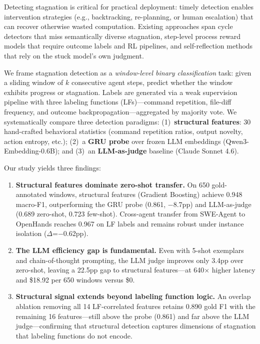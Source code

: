\documentclass[11pt,a4paper]{article}
\begin{document}
Detecting stagnation is critical for practical deployment: timely detection enables intervention strategies (e.g., backtracking, re-planning, or human escalation) that can recover otherwise wasted computation.
Existing approaches span cycle detectors \cite{zhuge2024cdcs,specra2025,trajad2025} that miss semantically diverse stagnation, step-level process reward models \cite{xi2026agentprm,prm2025framework} that require outcome labels and RL pipelines, and self-reflection methods \cite{shinn2023reflexion,yao2023tree} that rely on the stuck model's own judgment.

We frame stagnation detection as a \emph{window-level binary classification} task: given a sliding window of $k$ consecutive agent steps, predict whether the window exhibits progress or stagnation.
Labels are generated via a weak supervision pipeline with three labeling functions (LFs)---command repetition, file-diff frequency, and outcome backpropagation---aggregated by majority vote.
We systematically compare three detection paradigms: (1)~\textbf{structural features}: 30 hand-crafted behavioral statistics (command repetition ratios, output novelty, action entropy, etc.); (2)~a \textbf{GRU probe} over frozen LLM embeddings (Qwen3-Embedding-0.6B); and (3)~an \textbf{LLM-as-judge} baseline (Claude Sonnet 4.6).

Our study yields three findings:

\begin{enumerate}
\item \textbf{Structural features dominate zero-shot transfer.}
On 650 gold-annotated windows, structural features (Gradient Boosting) achieve 0.948 macro-F1, outperforming the GRU probe (0.861, $-$8.7pp) and LLM-as-judge (0.689 zero-shot, 0.723 few-shot).
Cross-agent transfer from SWE-Agent to OpenHands reaches 0.967 on LF labels and remains robust under instance isolation ($\Delta$=$-$0.62pp).

\item \textbf{The LLM efficiency gap is fundamental.}
Even with 5-shot exemplars and chain-of-thought prompting, the LLM judge improves only 3.4pp over zero-shot, leaving a 22.5pp gap to structural features---at 640$\times$ higher latency and \$18.92 per 650 windows versus \$0.

\item \textbf{Structural signal extends beyond labeling function logic.}
An overlap ablation removing all 14 LF-correlated features retains 0.890 gold F1 with the remaining 16 features---still above the probe (0.861) and far above the LLM judge---confirming that structural detection captures dimensions of stagnation that labeling functions do not encode.
\end{enumerate}
\end{document}
